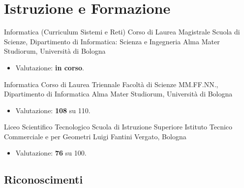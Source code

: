 %
%
%
%
%
%



\section{Istruzione e Formazione}

{Informatica (Curriculum Sistemi e Reti)}
{Corso di Laurea Magistrale}
{Scuola di Scienze, Dipartimento di Informatica: Scienza e Ingegneria}
{Alma Mater Studiorum, Università di Bologna}
{\begin{itemize}
	\item Valutazione: \textbf{in corso}.
\end{itemize}}

{Informatica}
{Corso di Laurea Triennale}
{Facoltà di Scienze MM.FF.NN., Dipartimento di Informatica}
{Alma Mater Studiorum, Università di Bologna}
{\begin{itemize}
	\item Valutazione: \textbf{108} su 110.
\end{itemize}}

{Liceo Scientifico Tecnologico}
{Scuola di Istruzione Superiore}
{Istituto Tecnico Commerciale e per Geometri Luigi Fantini}
{Vergato, Bologna}
{\begin{itemize}
	\item Valutazione: \textbf{76} su 100.
\end{itemize}}



\subsection{Riconoscimenti}

